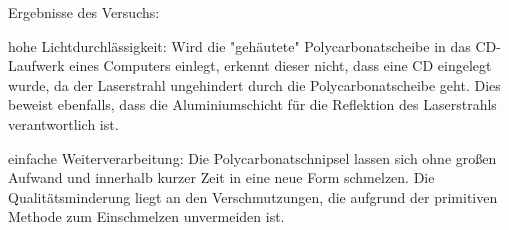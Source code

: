 Ergebnisse des Versuchs:
\begin{enumerate*}
    \item hohe Lichtdurchlässigkeit: Wird die "gehäutete" Polycarbonatscheibe in das CD-Laufwerk eines Computers einlegt, erkennt dieser nicht, dass eine CD eingelegt wurde, da der Laserstrahl ungehindert durch die Polycarbonatscheibe geht. Dies beweist ebenfalls, dass die Aluminiumschicht für die Reflektion des Laserstrahls verantwortlich ist.
    \item einfache Weiterverarbeitung: Die Polycarbonatschnipsel lassen sich ohne großen Aufwand und innerhalb kurzer Zeit in eine neue Form schmelzen. Die Qualitätsminderung liegt an den Verschmutzungen, die aufgrund der primitiven Methode zum Einschmelzen unvermeiden ist.
\end{enumerate*}

